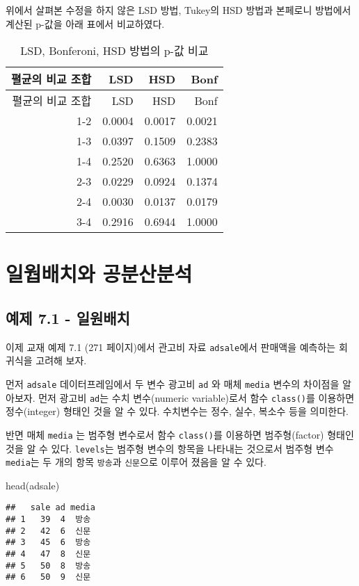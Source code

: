 \documentclass[
]{book}
\newenvironment{Shaded}{\begin{snugshade}}{\end{snugshade}}
\newcommand{\FunctionTok}[1]{\textcolor[rgb]{0.00,0.00,0.00}{#1}}
\newcommand{\NormalTok}[1]{#1}
\begin{document}
위에서 살펴본 수정을 하지 않은 LSD 방법, Tukey의 HSD 방법과 본페로니
방법에서 계산된 p-값을 아래 표에서 비교하였다.

\begin{longtable}[]{@{}rrrr@{}}
\caption{LSD, Bonferoni, HSD 방법의 p-값 비교}\tabularnewline
\toprule
펼균의 비교 조합 & LSD & HSD & Bonf\tabularnewline
\midrule
\endfirsthead
\toprule
펼균의 비교 조합 & LSD & HSD & Bonf\tabularnewline
\midrule
\endhead
1-2 & 0.0004 & 0.0017 & 0.0021\tabularnewline
1-3 & 0.0397 & 0.1509 & 0.2383\tabularnewline
1-4 & 0.2520 & 0.6363 & 1.0000\tabularnewline
2-3 & 0.0229 & 0.0924 & 0.1374\tabularnewline
2-4 & 0.0030 & 0.0137 & 0.0179\tabularnewline
3-4 & 0.2916 & 0.6944 & 1.0000\tabularnewline
\bottomrule
\end{longtable}

\hypertarget{chapter07}{%
\chapter{일웝배치와 공분산분석}\label{chapter07}}

\hypertarget{uxc608uxc81c-7.1---uxc77cuxc6d0uxbc30uxce58}{%
\section{예제 7.1 - 일원배치}\label{uxc608uxc81c-7.1---uxc77cuxc6d0uxbc30uxce58}}

이제 교재 예제 7.1 (271 페이지)에서 관고비 자료 \texttt{adsale}에서 판매액을 예측하는 회귀식을 고려해 보자.

먼저 \texttt{adsale} 데이터프레임에서 두 변수 광고비 \texttt{ad} 와 매체 \texttt{media} 변수의 차이점을 알아보자. 먼저 광고비 \texttt{ad}는 수치 변수(numeric variable)로서 함수 \texttt{class()}를 이용하면 정수(integer) 형태인 것을 알 수 있다. 수치변수는 정수, 실수, 복소수 등을 의미한다.

반면 매체 \texttt{media} 는 범주형 변수로서 함수 \texttt{class()}를 이용하면 범주형(factor) 형태인 것을 알 수 있다. \texttt{levels}는 범주형 변수의 항목을 나타내는 것으로서 범주형 변수 \texttt{media}는 두 개의 항목 \texttt{방송}과 \texttt{신문}으로 이루어 졌음을 알 수 있다.

\begin{Shaded}
\begin{Highlighting}[]
\FunctionTok{head}\NormalTok{(adsale)}
\end{Highlighting}
\end{Shaded}

\begin{verbatim}
##   sale ad media
## 1   39  4  방송
## 2   42  6  신문
## 3   45  6  방송
## 4   47  8  신문
## 5   50  8  방송
## 6   50  9  신문
\end{verbatim}
\end{document}
